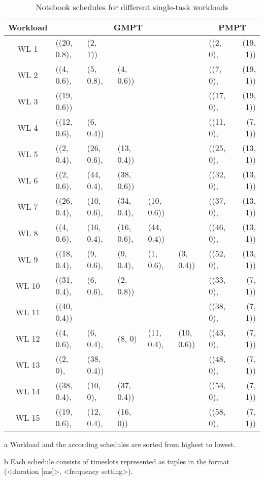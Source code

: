 \begin{table}[htpb]
 \centering
 \begin{threeparttable}
 \setlength\tabcolsep{3pt}
 \caption[Single-Task Notebook schedules]{Notebook schedules for different single-task workloads}\label{app:t_pmpt_n}
 \begin{tabular}{||c||l l l l l|l r||} 
 \hline
 Workload\tnote{a} & \multicolumn{5}{c|}{GMPT\tnote{b}} & \multicolumn{2}{c||}{PMPT\tnote{b}} \\ [0.5ex] 
 \hline\hline
  WL 1 & ((20, 0.8), & (2, 1)) & & & & ((2, 0), & (19, 1))\\
 \hline
 WL 2 & ((4, 0.6), & (5, 0.8), & (4, 0.6)) & & & ((7, 0), & (19, 1))\\
 \hline
 WL 3 & ((19, 0.6)) & & & & & ((17, 0), & (19, 1))\\
 \hline
 WL 4 & ((12, 0.6), & (6, 0.4)) & & & & ((11, 0), & (7, 1))\\
 \hline
 WL 5 & ((2, 0.4), & (26, 0.6), & (13, 0.4)) & & & ((25, 0), & (13, 1))\\
 \hline
 WL 6 & ((2, 0.6), & (44, 0.4), & (38, 0.6)) & & & ((32, 0), & (13, 1))\\
 \hline
 WL 7 & ((26, 0.4), & (10, 0.6), & (34, 0.4), & (10, 0.6)) & & ((37, 0), & (13, 1))\\
 \hline
 WL 8 & ((4, 0.6), & (16, 0.4), & (16, 0.6), & (44, 0.4)) & & ((46, 0), & (13, 1))\\
 \hline
 WL 9 & ((18, 0.4), & (9, 0.6), & (9, 0.4), & (1, 0.6), & (3, 0.4)) & ((52, 0), & (13, 1))\\
 \hline
 WL 10 & ((31, 0.4), & (6, 0.6), & (2, 0.8)) & & & ((33, 0), & (7, 1))\\
 \hline
 WL 11 & ((40, 0.4)) & & & & & ((38, 0), & (7, 1))\\
 \hline
 WL 12 & ((4, 0.6), & (6, 0.4), & (8, 0) & (11, 0.4), & (10, 0.6)) & ((43, 0), & (7, 1))\\
 \hline
 WL 13 & ((2, 0), & (38, 0.4)) & & & & ((48, 0), & (7, 1))\\
 \hline
 WL 14 & ((38, 0.4), & (10, 0), & (37, 0.4)) & & & ((53, 0), & (7, 1))\\
 \hline
 WL 15 & ((19, 0.6), & (12, 0.4), & (16, 0)) & & & ((58, 0), & (7, 1))\\
 \hline
\end{tabular}
\begin{tablenotes}
\item [a] Workload and the according schedules are sorted from highest to lowest.
\item [b] Each schedule consists of timeslots represented as tuples in the format\\(<duration [ms]>, <frequency setting>).
\end{tablenotes}
\end{threeparttable}
\end{table}